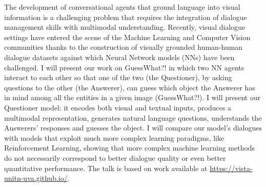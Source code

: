\documentclass[a4paper,11pt,oneside]{book}
\begin{document}
The development of conversational agents that ground language into visual information is a challenging problem that requires the integration of dialogue management skills with multimodal understanding. Recently, visual dialogue settings have entered the scene of the Machine Learning and Computer Vision communities thanks to the construction of visually grounded human-human dialogue datasets against which Neural Network models (NNs) have been challenged. I will present our work on GuessWhat?! in which two NN agents interact to each other so that one of the two (the Questioner), by asking questions to the other (the Answerer), can guess which object the Answerer has in mind among all the entities in a given image (GuessWhat?!).  I will present our Questioner model: it encodes both visual and textual inputs, produces a multimodal representation, generates natural language questions, understands the Answerers' responses and guesses the object. I will compare our model's dialogues with models that exploit much more complex learning paradigms, like Reinforcement Learning, showing that more complex machine learning methods do not necessarily correspond to better dialogue quality or even better quantitative performance. The talk is based on work available at \url{https://vista-unitn-uva.github.io/}.


\clearpage



\setlength{\parskip}{0pt}

\renewcommand{\contentsname}{\mbox{}\\[-108pt]\noindent\textbf{\Large
    Table of Contents}\\[-28pt]}
\tableofcontents
\cleardoublepage



 


\end{document}
